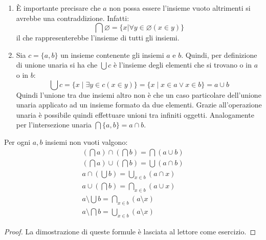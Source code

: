 \begin{osservation}
\begin{enumerate}
	\item È importante precisare che $a$ non possa essere l'insieme vuoto altrimenti si avrebbe una contraddizione. Infatti:
	\begin{displaymath}
		\bigcap \varnothing = \{x | \forall y \in \varnothing (x \in y)\}
	\end{displaymath}
	il che rappresenterebbe l'insieme di tutti gli insiemi.
	
	\item Sia $c=\{a,b\}$ un insieme contenente gli insiemi $a$ e $b$. Quindi, per definizione di unione unaria si ha che $\bigcup c$ è l'insieme degli elementi che si trovano o in $a$ o in $b$:
	\begin{displaymath}
		\bigcup c = \{x \; | \; \exists y \in c (x \in y)\} = \{x \; | \; x \in a \vee x \in b\} = a \cup b
	\end{displaymath}
	Quindi l'unione tra due insiemi altro non è che un caso particolare dell'unione unaria applicato ad un insieme formato da due elementi. Grazie all'operazione unaria è possibile quindi effettuare unioni tra infiniti oggetti. Analogamente per l'intersezione unaria $\bigcap \{a,b\} = a \cap b$.
\end{enumerate}
\end{osservation}

\begin{propbox}
	Per ogni $a,b$ insiemi non vuoti valgono:
	\begin{eqnarray}
		(\bigcap a) \cap (\bigcap b) = \bigcap (a \cup b) \\
		(\bigcap a) \cup (\bigcap b) = \bigcup (a \cap b )\\
		a \cap (\bigcup b) = \bigcup_{x \in b} (a \cap x) \\
		a \cup (\bigcap b) = \bigcap_{x \in b} (a \cup x)\\
		a \setminus \bigcup b = \bigcap_{x \in b} ( a \setminus x) \\
		a \setminus \bigcap b = \bigcup_{x \in b} (a \setminus x)
	\end{eqnarray}
\end{propbox}

\begin{proof} 
	La dimostrazione di queste formule è lasciata al lettore come esercizio.
\end{proof}

